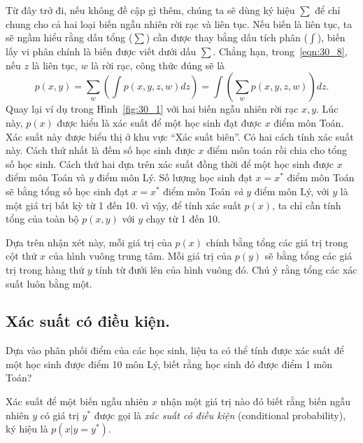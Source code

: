 
Từ đây trở đi, nếu không đề cập gì thêm, chúng ta sẽ dùng ký hiệu $\sum$ để chỉ
chung cho cả hai loại biến ngẫu nhiên rời rạc và liên tục. Nếu biến là liên tục,
ta sẽ ngầm hiểu rằng dấu tổng ($\sum$) cần được thay bằng dấu tích phân
($\int$), biến lấy vi phân chính là biến được viết dưới dấu $\sum$. Chẳng hạn,
trong~\eqref{eqn:30_8}, nếu $z$ là liên tục, $w$ là rời rạc, công thức đúng sẽ
là
\begin{equation}
p(x, y) = \sum_{w}\left( \int p(x, y, z, w)dz \right) = \int \left( \sum_{w} p(x, y, z, w)\right) dz.
\end{equation}
Quay lại ví dụ trong Hình~\ref{fig:30_1} với hai biến ngẫu nhiên rời rạc $x, y$.
Lúc này, $p(x)$ được hiểu là xác suất để một học sinh đạt được $x$ điểm môn
Toán. Xác suất này được biểu thị ở khu vực ``Xác suất biên''. Có hai cách tính
xác suất này. Cách thứ nhất là đếm số học sinh được $x$ điểm môn toán rồi chia
cho tổng số học sinh. Cách thứ hai dựa trên xác suất đồng thời để một học sinh
được $x$ điểm môn Toán và $y$ điểm môn Lý. Số lượng học sinh đạt $x = x^*$ điểm
môn Toán sẽ bằng tổng số học sinh đạt $x = x^*$ điểm môn Toán \textit{và} $y$
điểm môn Lý, với $y$ là một giá trị bất kỳ từ 1 đến 10. vì vậy, để tính xác suất
$p(x)$, ta chỉ cần tính tổng của toàn bộ $p(x, y)$ với $y$ chạy từ 1 đến 10.

Dựa trên nhận xét này, mỗi giá trị của $p(x)$ chính bằng tổng các giá trị trong
cột thứ $x$ của hình vuông trung tâm. Mỗi giá trị của $p(y)$ sẽ bằng tổng các
giá trị trong hàng thứ $y$ tính từ đưới lên của hình vuông đó. Chú ý rằng tổng
các xác suất luôn bằng một.


\subsection{Xác suất có điều kiện.}

{Dựa vào phân phối điểm của các học sinh, liệu ta có thể tính được xác suất để
một học sinh được điểm 10 môn Lý, biết rằng học sinh đó được điểm 1 môn Toán?}

Xác suất để một biến ngẫu nhiên $x$ nhận một giá trị nào đó biết
rằng biến ngẫu nhiên $y$ có giá trị $y^*$ được gọi là \textit{xác suất có điều
kiện} (conditional probability), ký hiệu là $p(x| y = y^*)$.


